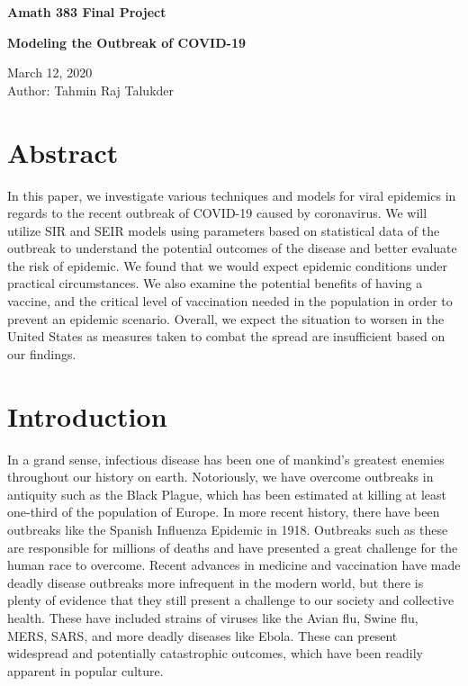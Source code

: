\documentclass[12pt, a4paper]{article}
\begin{document}
{\begin{titlepage}
    \begin{center}
        \vspace*{3cm}
        \Huge\textbf{Amath 383 Final Project}
        
        \Huge\textbf{Modeling the Outbreak of COVID-19}
        
        \vspace{2cm}
        
        \Large March 12, 2020 \\
        \Large Author: Tahmin Raj Talukder
        
    \end{center}


\end{titlepage}}

\tableofcontents


\newpage
\section{Abstract}

In this paper, we investigate various techniques and models for viral epidemics in regards to the recent outbreak of COVID-19 caused by coronavirus. We will utilize SIR and SEIR models using parameters based on statistical data of the outbreak to understand the potential outcomes of the disease and better evaluate the risk of epidemic. We found that we would expect epidemic conditions under practical circumstances. We also examine the potential benefits of having a vaccine, and the critical level of vaccination needed in the population in order to prevent an epidemic scenario. Overall, we expect the situation to worsen in the United States as measures taken to combat the spread are insufficient based on our findings.

\section{Introduction}

In a grand sense, infectious disease has been one of mankind's greatest enemies throughout our history on earth. Notoriously, we have overcome outbreaks in antiquity such as the Black Plague, which has been estimated at killing at least one-third of the population of Europe. In more recent history, there have been outbreaks like the Spanish Influenza Epidemic in 1918. Outbreaks such as these are responsible for millions of deaths and have presented a great challenge for the human race to overcome. Recent advances in medicine and vaccination have made deadly disease outbreaks more infrequent in the modern world, but there is plenty of evidence that they still present a challenge to our society and collective health. These have included strains of viruses like the Avian flu, Swine flu, MERS, SARS, and more deadly diseases like Ebola. These can present widespread and potentially catastrophic outcomes, which have been readily apparent in popular culture. 
\end{document}
